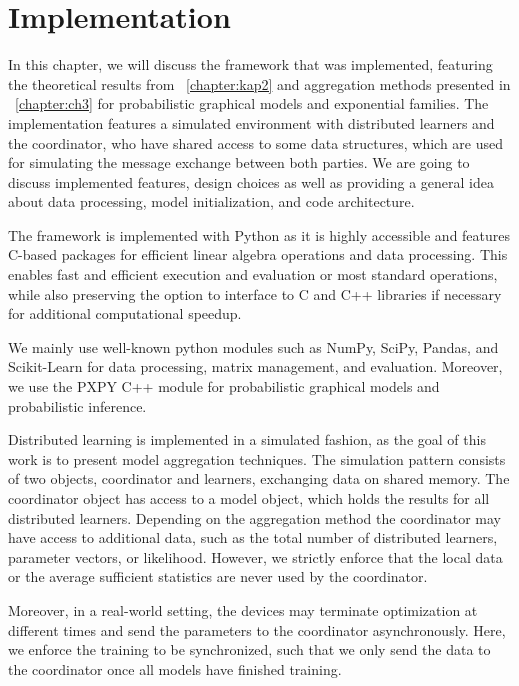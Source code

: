 
\chapter{Implementation}
\label{chapter:ch4}
In this chapter, we will discuss the framework that was implemented, featuring the theoretical results from \chap~\ref{chapter:kap2} and aggregation methods presented in \chap~\ref{chapter:ch3} for probabilistic graphical models and exponential families.
The implementation features a simulated environment with distributed learners and the coordinator, who have shared access to some data structures, which are used for simulating the message exchange between both parties.
We are going to discuss implemented features, design choices as well as providing a general idea about data processing, model initialization, and code architecture.

The framework is implemented with Python as it is highly accessible and features C-based packages for efficient linear algebra operations and data processing.
This enables fast and efficient execution and evaluation or most standard operations, while also preserving the option to interface to C and C++ libraries if necessary for additional computational speedup.

We mainly use well-known python modules such as NumPy, SciPy, Pandas, and Scikit-Learn for data processing, matrix management, and evaluation.
Moreover, we use the PXPY C++ module for probabilistic graphical models and probabilistic inference.

Distributed learning is implemented in a simulated fashion, as the goal of this work is to present model aggregation techniques.
The simulation pattern consists of two objects, coordinator and learners, exchanging data on shared memory. 
The coordinator object has access to a model object, which holds the results for all distributed learners.
Depending on the aggregation method the coordinator may have access to additional data, such as the total number of distributed learners, parameter vectors, or likelihood. 
However, we strictly enforce that the local data or the average sufficient statistics are never used by the coordinator.

Moreover, in a real-world setting, the devices may terminate optimization at different times and send the parameters to the coordinator asynchronously. 
Here, we enforce the training to be synchronized, such that we only send the data to the coordinator once all models have finished training.

